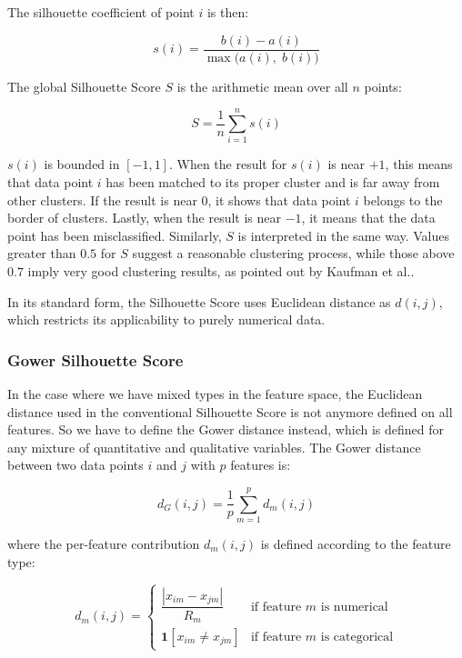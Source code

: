 The silhouette coefficient of point $i$ is then:

\begin{equation}
    s(i) = \frac{b(i) - a(i)}{\max\bigl(a(i),\; b(i)\bigr)}
    \label{eq:silhouette_si}
\end{equation}

The global Silhouette Score $S$ is the arithmetic mean over all $n$ points:

\begin{equation}
    S = \frac{1}{n} \sum_{i=1}^{n} s(i)
    \label{eq:silhouette_global}
\end{equation}

$s(i)$ is bounded in $[-1, 1]$. When the result for $s(i)$ is near $+1$, this means that data point $i$ has been matched to its proper cluster and is far away from other clusters. If the result is near $0$, it shows that data point $i$ belongs to the border of clusters. Lastly, when the result is near $-1$, it means that the data point has been misclassified. Similarly, $S$ is interpreted in the same way. Values greater than $0.5$ for $S$ suggest a reasonable clustering process, while those above $0.7$ imply very good clustering results, as pointed out by Kaufman et al.\cite{kaufman1990}.

In its standard form, the Silhouette Score uses Euclidean distance as $d(i,j)$, which restricts its applicability to purely numerical data.

\subsubsection*{Gower Silhouette Score}
\label{ch:gower}

In the case where we have mixed types in the feature space, the Euclidean distance used in the conventional Silhouette Score is not anymore defined on all features. So we have to define the Gower distance \cite{gower1971} instead, which is defined for any mixture of quantitative and qualitative variables. The Gower distance between two data points $i$ and $j$ with $p$ features is:

\begin{equation}
    d_G(i, j) = \frac{1}{p} \sum_{m=1}^{p} d_m(i, j)
    \label{eq:gower}
\end{equation}

where the per-feature contribution $d_m(i, j)$ is defined according to the feature type:

\begin{equation}
    d_m(i, j) =
    \begin{cases}
        \dfrac{|x_{im} - x_{jm}|}{R_m} & \text{if feature } m \text{ is numerical} \\[8pt]
        \mathbf{1}[x_{im} \neq x_{jm}]  & \text{if feature } m \text{ is categorical}
    \end{cases}
    \label{eq:gower_dm}
\end{equation}


